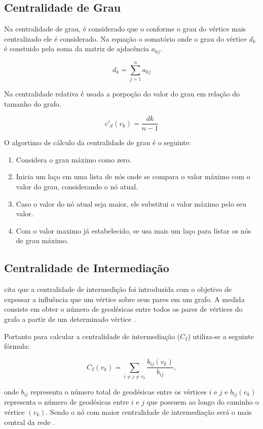\documentclass[12pt]{article}
\begin{document}
\subsection{Centralidade de Grau}
Na centralidade de grau, é considerado que o conforme o grau do vértice mais centralizado ele é considerado.
Na equação o somatório onde o grau do vértice $d_{k}$ é constuido pela soma da matriz de ajdacência $a_{kj}$.
\begin{center}
\begin{equation}
d_{k}= \sum_{j=1}^{n}a_{kj}
\end{equation}
\end{center}
Na centralidade relativa é usada a porpoção do valor do grau em relação do tamanho do grafo.
\begin{center}
\begin{equation}
{c}'_{d}(v_{k})=\frac{dk}{n-1}
\end{equation}
\end{center}
O algortimo de cálculo da centralidade de grau é o seguinte:
\begin{enumerate}
\item Considera o grau máximo como zero.
\item Inicia um laço em uma lista de nós onde se compara o valor máximo com o valor do grau, considerando o nó atual.
\item Caso o valor do nó atual seja maior, ele substitui o valor máximo pelo seu valor.
\item Com o valor maximo já estabelecido, se usa mais um laço para listar os nós de grau máximo.
\end{enumerate}

\subsection{Centralidade de Intermediação}
\cite{freitas} cita que a centralidade de intermedição foi introduzida com o objetivo de expessar a influência que um vértice sobre seus pares em um grafo.
A medida consiste em obter o número de geodésicas entre todos os pares de vértices do grafo a partir de um determinado vértice \cite{freitas}.

Portanto para calcular a centralidade de intermediação ($C_I$) utiliza-se a seguinte fórmula: 
\begin{center}
\begin{equation}
C_I(v_k)=\sum_{i\neq j \neq v_{k}} \frac{b_{ij}(v_k)}{b_{ij}},
\end{equation}
\end{center}
onde $b_{ij}$ representa o número total de geodésicas entre os vértices $i$ e $j$ e  $b_{ij}(v_k)$ representa o número de geodésicas entre $i$ e $j$ que possuem ao longo do caminho o vértice $(v_k)$.
Sendo o nó com maior centralidade de intermediação será o mais central da rede \cite{ufimtsev} \cite{freeman}.
\end{document}
